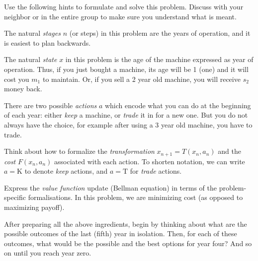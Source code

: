 \documentclass[a4paper]{article}
\begin{document}
Use the following hints to formulate and solve this problem.
Discuss with your neighbor or in the entire group to make sure you understand what is meant.

\begin{compactitem}
\item
  The natural \emph{stages} $n$ (or steps) in this problem are the years of operation, and it is easiest to plan backwards.
\item
  The natural \emph{state} $x$ in this problem is the age of the machine expressed as year of operation.
  Thus, if you just bought a machine, its age will be 1 (one) and it will cost you $m_1$ to maintain.
  Or, if you sell a 2 year old machine, you will receive $s_2$ money back.
\item
  There are two possible \emph{actions} $a$ which encode what you can do at the beginning of each year:
  either \emph{keep} a machine, or \emph{trade} it in for a new one.
  But you do not always have the choice, for example after using a 3 year old machine, you have to trade.
\item
  Think about how to formalize the \emph{transformation} $x_{n+1}=T(x_n,a_n)$ and the \emph{cost} $F(x_n,a_n)$ associated with each action.
  To shorten notation, we can write $a=\text{K}$ to denote \emph{keep} actions, and $a=\text{T}$ for \emph{trade} actions.
\item
  Express the \emph{value function} update (Bellman equation) in terms of the problem-specific formalisations.
  In this problem, we are minimizing cost (as opposed to maximizing payoff).
\item
  After preparing all the above ingredients, begin by thinking about what are the possible outcomes of the last (fifth) year in isolation.
  Then, for each of these outcomes, what would be the possible and the best options for year four?
  And so on until you reach year zero.
\end{compactitem}
\end{document}
